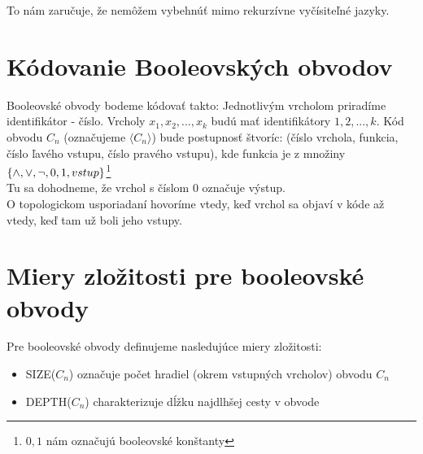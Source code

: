 To nám zaručuje, že nemôžem vybehnúť mimo rekurzívne vyčísiteľné jazyky.

\section{Kódovanie Booleovských obvodov}

Booleovské obvody bodeme kódovať takto:
Jednotlivým vrcholom priradíme identifikátor - číslo.
Vrcholy $x_1,x_2,...,x_k$ budú mať identifikátory $1,2,...,k$.
Kód obvodu $C_n$ (označujeme $\langle C_n \rangle$) bude postupnosť štvoríc:
(číslo vrchola, funkcia, číslo ľavého vstupu, číslo pravého vstupu),
kde funkcia je z množiny $\{\wedge, \vee, \neg, 0, 1, vstup\}$\footnote{
  $0,1$ nám označujú booleovské konštanty}\\ Tu sa
dohodneme, že vrchol s číslom 0 označuje výstup.\\ O topologickom usporiadaní hovoríme
vtedy, keď vrchol sa objaví v kóde až vtedy, keď tam už boli jeho vstupy.

\section{Miery zložitosti pre booleovské obvody}

Pre booleovské obvody definujeme nasledujúce miery zložitosti:
\begin{itemize}
  \item{SIZE($C_n$) }označuje počet hradiel (okrem vstupných vrcholov) obvodu $C_n$
  \item{DEPTH($C_n$) }charakterizuje dĺžku najdlhšej cesty v obvode
\end{itemize}

